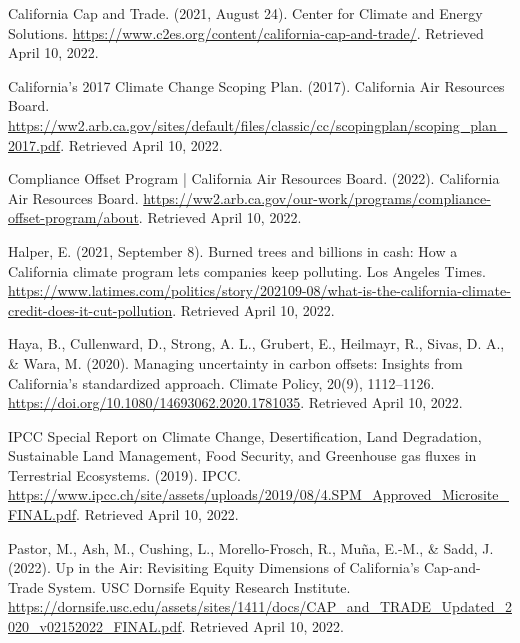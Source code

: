 \documentclass[11pt]{article}
\begin{document}
\smallskip\noindent
California Cap and Trade. (2021, August 24). Center for Climate and Energy Solutions. \url{https://www.c2es.org/content/california-cap-and-trade/}. Retrieved April 10, 2022.

\smallskip\noindent
California's 2017 Climate Change Scoping Plan. (2017). California Air Resources Board. \url{https://ww2.arb.ca.gov/sites/default/files/classic/cc/scopingplan/scoping_plan_2017.pdf}. Retrieved April 10, 2022.

\smallskip\noindent
Compliance Offset Program | California Air Resources Board. (2022). California Air Resources Board. \url{https://ww2.arb.ca.gov/our-work/programs/compliance-offset-program/about}. Retrieved April 10, 2022.

\smallskip\noindent
Halper, E. (2021, September 8). Burned trees and billions in cash: How a California climate program lets companies keep polluting. Los Angeles Times. \url{https://www.latimes.com/politics/story/202109-08/what-is-the-california-climate-credit-does-it-cut-pollution}. Retrieved April 10, 2022.

\smallskip\noindent
Haya, B., Cullenward, D., Strong, A. L., Grubert, E., Heilmayr, R., Sivas, D. A., \& Wara, M. (2020). Managing uncertainty in carbon offsets: Insights from California's standardized approach. Climate Policy, 20(9), 1112--1126. \url{https://doi.org/10.1080/14693062.2020.1781035}. Retrieved April 10, 2022.

\smallskip\noindent
IPCC Special Report on Climate Change, Desertification, Land Degradation, Sustainable Land Management, Food Security, and Greenhouse gas fluxes in Terrestrial Ecosystems. (2019). IPCC. \url{https://www.ipcc.ch/site/assets/uploads/2019/08/4.SPM_Approved_Microsite_FINAL.pdf}. Retrieved April 10, 2022.


\smallskip\noindent
Pastor, M., Ash, M., Cushing, L., Morello-Frosch, R., Muña, E.-M., \& Sadd, J. (2022). Up in the Air: Revisiting Equity Dimensions of California's Cap-and-Trade System. USC Dornsife Equity Research Institute. \url{https://dornsife.usc.edu/assets/sites/1411/docs/CAP_and_TRADE_Updated_2020_v02152022_FINAL.pdf}. Retrieved April 10, 2022.
\end{document}
